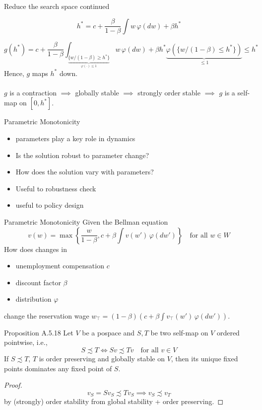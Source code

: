\begin{frame}{Reduce the search space continued}

$$
 h^* = c + \frac{\beta}{1-\beta}\int w\,\varphi(dw) + \beta h^*
$$

$$
 g(h^*) =c + \frac{\beta}{1-\beta}\int_{\underbrace{\{w/(1-\beta)\ge h^*\}}_{\varphi(\cdot)\le1}}w\,\varphi(dw) + \beta h^*\underbrace{\varphi(\{w/(1-\beta)\le h^*\})}_{\le1}\le h^*
$$
Hence, $g$ maps $h^*$ down.\\
\\
$g$ is a contraction $\implies$ globally stable $\implies$ strongly order stable $\implies$ $g$ is a self-map on $[0, h^*]$.
\end{frame}

\begin{frame}{Parametric Monotonicity}
    \begin{itemize}
        \item parameters play a key role in dynamics
        \item Is the solution robust to parameter change?
        \item  How does the solution vary with parameters?
        \item Useful to robustness check
        \item useful to policy design
    \end{itemize}
\end{frame}

\begin{frame}{Parametric Monotonicity}
        Given the Bellman equation
    $$
    v(w)  = \max\left\{\frac{w}{1-\beta}, c+\beta\int v(w') \,\varphi(dw')\right\}\quad\text{for all $w\in W$}
    $$
    How does changes in 
    \begin{itemize}
        \item unemployment compensation $c$
        \item discount factor $\beta$
        \item distribution $\varphi$
    \end{itemize}
    change the reservation wage $w_\top = (1-\beta) (c+\beta\int v_\top(w')\, \varphi(dw'))$.
\end{frame}

\begin{frame}{Proposition A.5.18}
Let $V$ be a pospace and $S,T$ be two self-map on $V$ ordered pointwise, i.e.,
$$
S\precsim T\iff Sv\precsim Tv\quad \text{for all $v\in V$}
$$
If $S\precsim T$, $T$ is order preserving and globally stable on $V$, then its unique fixed points dominates any fixed point of $S$.
\begin{proof}
   $$
   v_S = Sv_S\precsim Tv_S\implies v_S\precsim v_T
   $$
   by (strongly) order stability from global stability + order preserving.
\end{proof}
    
\end{frame}

